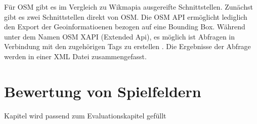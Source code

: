 Für OSM gibt es im Vergleich zu Wikmapia ausgereifte Schnittstellen. Zunächst gibt es zwei Schnittstellen direkt von OSM.
Die OSM API ermöglicht lediglich den Export der Geoinformatioenen bezogen auf eine Bounding Box. Während unter dem Namen OSM XAPI (Extended Api), es möglich ist Abfragen in Verbindung mit den zugehörigen Tags zu erstellen \cite{Meyer.2013}. Die Ergebnisse der Abfrage werden in einer XML Datei zusammengefasst.



\section{Bewertung von Spielfeldern}
\label{ch3:s:geostatistik}

Kapitel wird passend zum Evaluationskapitel gefüllt